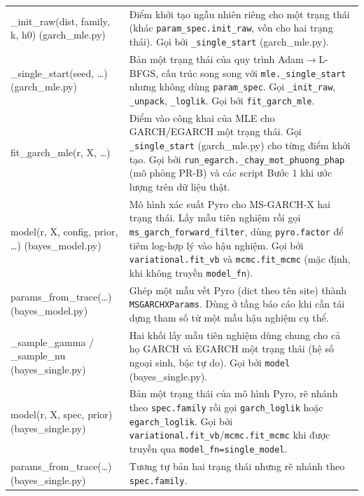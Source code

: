 \documentclass[11pt,a4paper]{article}
\newcommand{\code}[1]{\texttt{#1}}
\begin{document}
\begin{longtable}{@{}>{\ttfamily\scriptsize\raggedright\arraybackslash}p{5.0cm} >{\raggedright\arraybackslash}p{9.5cm}@{}}
\_init\_raw(dist, family, k, h0) \newline \footnotesize{(garch\_mle.py)} & Điểm khởi tạo ngẫu nhiên riêng cho một trạng thái (khác \code{param\_spec.init\_raw}, vốn cho hai trạng thái). Gọi bởi \code{\_single\_start} (garch\_mle.py). \\
\_single\_start(seed, \ldots) \newline \footnotesize{(garch\_mle.py)} & Bản một trạng thái của quy trình Adam$\to$L-BFGS, cấu trúc song song với \code{mle.\_single\_start} nhưng không dùng \code{param\_spec}. Gọi \code{\_init\_raw}, \code{\_unpack}, \code{\_loglik}. Gọi bởi \code{fit\_garch\_mle}. \\
fit\_garch\_mle(r, X, \ldots) & Điểm vào công khai của MLE cho GARCH/EGARCH một trạng thái. Gọi \code{\_single\_start} (garch\_mle.py) cho từng điểm khởi tạo. Gọi bởi \code{run\_egarch.\_chay\_mot\_phuong\_phap} (mô phỏng PR-B) và các script Bước 1 khi ước lượng trên dữ liệu thật. \\
model(r, X, config, prior, \ldots) \newline \footnotesize{(bayes\_model.py)} & Mô hình xác suất Pyro cho MS-GARCH-X hai trạng thái. Lấy mẫu tiên nghiệm rồi gọi \code{ms\_garch\_forward\_filter}, dùng \code{pyro.factor} để tiêm log-hợp lý vào hậu nghiệm. Gọi bởi \code{variational.fit\_vb} và \code{mcmc.fit\_mcmc} (mặc định, khi không truyền \code{model\_fn}). \\
params\_from\_trace(\ldots) \newline \footnotesize{(bayes\_model.py)} & Ghép một mẫu vết Pyro (dict theo tên site) thành \code{MSGARCHXParams}. Dùng ở tầng báo cáo khi cần tái dựng tham số từ một mẫu hậu nghiệm cụ thể. \\
\_sample\_gamma / \_sample\_nu \newline \footnotesize{(bayes\_single.py)} & Hai khối lấy mẫu tiên nghiệm dùng chung cho cả họ GARCH và EGARCH một trạng thái (hệ số ngoại sinh, bậc tự do). Gọi bởi \code{model} (bayes\_single.py). \\
model(r, X, spec, prior) \newline \footnotesize{(bayes\_single.py)} & Bản một trạng thái của mô hình Pyro, rẽ nhánh theo \code{spec.family} rồi gọi \code{garch\_loglik} hoặc \code{egarch\_loglik}. Gọi bởi \code{variational.fit\_vb}/\code{mcmc.fit\_mcmc} khi được truyền qua \code{model\_fn=single\_model}. \\
params\_from\_trace(\ldots) \newline \footnotesize{(bayes\_single.py)} & Tương tự bản hai trạng thái nhưng rẽ nhánh theo \code{spec.family}. \\

\end{longtable}
\end{document}
